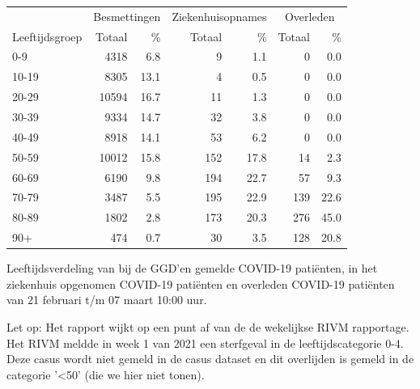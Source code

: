 \documentclass[
  english,
  man,floatsintext]{apa6}
\begin{document}
\begin{table}
\centering\begingroup\fontsize{11}{13}\selectfont

\begin{threeparttable}
\begin{tabular}{lrrrrrr}
\toprule
\multicolumn{1}{c}{ } & \multicolumn{2}{c}{Besmettingen} & \multicolumn{2}{c}{Ziekenhuisopnames} & \multicolumn{2}{c}{Overleden} \\
\cmidrule(l{3pt}r{3pt}){2-3} \cmidrule(l{3pt}r{3pt}){4-5} \cmidrule(l{3pt}r{3pt}){6-7}
Leeftijdsgroep & Totaal & \% & Totaal & \% & Totaal & \%\\
\midrule
0-9 & 4318 & 6.8 & 9 & 1.1 & 0 & 0.0\\
10-19 & 8305 & 13.1 & 4 & 0.5 & 0 & 0.0\\
20-29 & 10594 & 16.7 & 11 & 1.3 & 0 & 0.0\\
30-39 & 9334 & 14.7 & 32 & 3.8 & 0 & 0.0\\
40-49 & 8918 & 14.1 & 53 & 6.2 & 0 & 0.0\\
50-59 & 10012 & 15.8 & 152 & 17.8 & 14 & 2.3\\
60-69 & 6190 & 9.8 & 194 & 22.7 & 57 & 9.3\\
70-79 & 3487 & 5.5 & 195 & 22.9 & 139 & 22.6\\
80-89 & 1802 & 2.8 & 173 & 20.3 & 276 & 45.0\\
90+ & 474 & 0.7 & 30 & 3.5 & 128 & 20.8\\
\bottomrule
\end{tabular}
\begin{tablenotes}
\item[1] Leeftijdsverdeling van bij de GGD’en gemelde COVID-19 patiënten, in het ziekenhuis opgenomen COVID-19 patiënten en overleden COVID-19 patiënten van 21 februari t/m 07 maart 10:00 uur.
\item[2] Let op: Het rapport wijkt op een punt af van de de wekelijkse RIVM rapportage. Het RIVM meldde in week 1 van 2021 een sterfgeval in de leeftijdscategorie 0-4. Deze casus wordt niet gemeld in de casus dataset en dit overlijden is gemeld in de categorie '<50' (die we hier niet tonen).
\end{tablenotes}
\end{threeparttable}
\endgroup{}
\end{table}

\newpage
\end{document}
